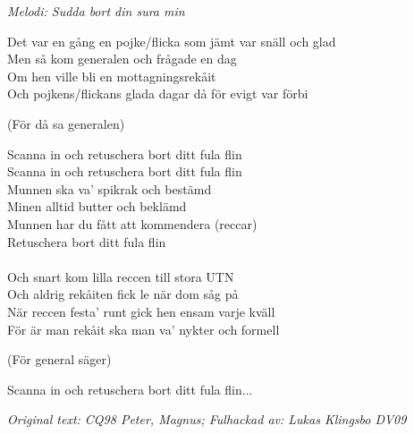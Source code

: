 {\footnotesize\textit{Melodi: Sudda bort din sura min}}\par
\par
\vspace{10pt}
Det var en gång en pojke/flicka som jämt var snäll och glad\\
Men så kom generalen och frågade en dag\\
Om hen ville bli en mottagningsrekåit\\
Och pojkens/flickans glada dagar då för evigt var förbi\par
\vspace{10pt}
(För då sa generalen)\par
\vspace{10pt}
Scanna in och retuschera bort ditt fula flin\\
Scanna in och retuschera bort ditt fula flin\\
Munnen ska va' spikrak och bestämd\\
Minen alltid butter och beklämd\\
Munnen har du fått att kommendera (reccar)\\
Retuschera bort ditt fula flin\\
\\
Och snart kom lilla reccen till stora UTN\\
Och aldrig rekåiten fick le när dom såg på\\
När reccen festa' runt gick hen ensam varje kväll\\
För är man rekåit ska man va' nykter och formell\par
\vspace{10pt}
(För general säger)\par
\vspace{10pt}
Scanna in och retuschera bort ditt fula flin...
\par
\vspace{10pt}
{\footnotesize\textit{Original text: CQ98 Peter, Magnus; Fulhackad av: Lukas Klingsbo DV09}}
